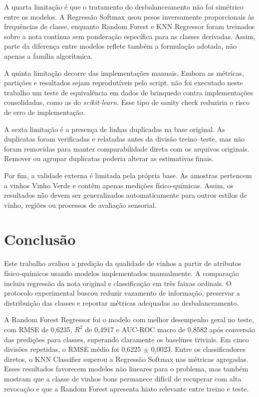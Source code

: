 \documentclass[12pt,a4paper]{article}
\begin{document}
A quarta limita\c{c}\~ao \'e que o tratamento do desbalanceamento n\~ao foi sim\'etrico entre os modelos. A Regress\~ao Softmax usou pesos inversamente proporcionais \`as frequ\^encias de classe, enquanto Random Forest e KNN Regressor foram treinados sobre a nota cont\'inua sem pondera\c{c}\~ao espec\'ifica para as classes derivadas. Assim, parte da diferen\c{c}a entre modelos reflete tamb\'em a formula\c{c}\~ao adotada, n\~ao apenas a fam\'ilia algor\'itmica.

A quinta limita\c{c}\~ao decorre das implementa\c{c}\~oes manuais. Embora as m\'etricas, parti\c{c}\~oes e resultados sejam reprodut\'iveis pelo script, n\~ao foi executado neste trabalho um teste de equival\^encia em dados de brinquedo contra implementa\c{c}\~oes consolidadas, como as do \textit{scikit-learn}. Esse tipo de sanity check reduziria o risco de erro de implementa\c{c}\~ao.

A sexta limita\c{c}\~ao \'e a presen\c{c}a de linhas duplicadas na base original. As duplicatas foram verificadas e relatadas antes da divis\~ao treino--teste, mas n\~ao foram removidas para manter comparabilidade direta com os arquivos originais. Remover ou agrupar duplicatas poderia alterar as estimativas finais.

Por fim, a validade externa \'e limitada pela pr\'opria base. As amostras pertencem a vinhos Vinho Verde e cont\^em apenas medi\c{c}\~oes f\'isico-qu\'imicas. Assim, os resultados n\~ao devem ser generalizados automaticamente para outros estilos de vinho, regi\~oes ou processos de avalia\c{c}\~ao sensorial.

\section{Conclus\~ao}
\label{sec:conclusao}

Este trabalho avaliou a predi\c{c}\~ao da qualidade de vinhos a partir de atributos f\'isico-qu\'imicos usando modelos implementados manualmente. A compara\c{c}\~ao incluiu regress\~ao da nota original e classifica\c{c}\~ao em tr\^es faixas ordinais. O protocolo experimental buscou reduzir vazamento de informa\c{c}\~ao, preservar a distribui\c{c}\~ao das classes e reportar m\'etricas adequadas ao desbalanceamento.

A Random Forest Regressor foi o modelo com melhor desempenho geral no teste, com RMSE de 0,6235, $R^2$ de 0,4917 e AUC-ROC macro de 0,8582 ap\'os convers\~ao das predi\c{c}\~oes para classes, superando claramente os baselines triviais. Em cinco divis\~oes repetidas, o RMSE m\'edio foi 0,6225 $\pm$ 0,0023. Entre os classificadores diretos, o KNN Classifier superou a Regress\~ao Softmax nas m\'etricas agregadas. Esses resultados favorecem modelos n\~ao lineares para o problema, mas tamb\'em mostram que a classe de vinhos bons permanece dif\'icil de recuperar com alta revoca\c{c}\~ao e que a Random Forest apresenta hiato relevante entre treino e teste.
\end{document}
